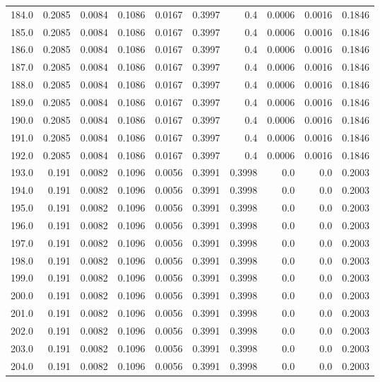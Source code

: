 \begin{longtable}{lrrrrrrrrr}
184.0 & 0.2085 & 0.0084 & 0.1086 & 0.0167 & 0.3997 & 0.4 & 0.0006 & 0.0016 & 0.1846 \\
185.0 & 0.2085 & 0.0084 & 0.1086 & 0.0167 & 0.3997 & 0.4 & 0.0006 & 0.0016 & 0.1846 \\
186.0 & 0.2085 & 0.0084 & 0.1086 & 0.0167 & 0.3997 & 0.4 & 0.0006 & 0.0016 & 0.1846 \\
187.0 & 0.2085 & 0.0084 & 0.1086 & 0.0167 & 0.3997 & 0.4 & 0.0006 & 0.0016 & 0.1846 \\
188.0 & 0.2085 & 0.0084 & 0.1086 & 0.0167 & 0.3997 & 0.4 & 0.0006 & 0.0016 & 0.1846 \\
189.0 & 0.2085 & 0.0084 & 0.1086 & 0.0167 & 0.3997 & 0.4 & 0.0006 & 0.0016 & 0.1846 \\
190.0 & 0.2085 & 0.0084 & 0.1086 & 0.0167 & 0.3997 & 0.4 & 0.0006 & 0.0016 & 0.1846 \\
191.0 & 0.2085 & 0.0084 & 0.1086 & 0.0167 & 0.3997 & 0.4 & 0.0006 & 0.0016 & 0.1846 \\
192.0 & 0.2085 & 0.0084 & 0.1086 & 0.0167 & 0.3997 & 0.4 & 0.0006 & 0.0016 & 0.1846 \\
193.0 & 0.191 & 0.0082 & 0.1096 & 0.0056 & 0.3991 & 0.3998 & 0.0 & 0.0 & 0.2003 \\
194.0 & 0.191 & 0.0082 & 0.1096 & 0.0056 & 0.3991 & 0.3998 & 0.0 & 0.0 & 0.2003 \\
195.0 & 0.191 & 0.0082 & 0.1096 & 0.0056 & 0.3991 & 0.3998 & 0.0 & 0.0 & 0.2003 \\
196.0 & 0.191 & 0.0082 & 0.1096 & 0.0056 & 0.3991 & 0.3998 & 0.0 & 0.0 & 0.2003 \\
197.0 & 0.191 & 0.0082 & 0.1096 & 0.0056 & 0.3991 & 0.3998 & 0.0 & 0.0 & 0.2003 \\
198.0 & 0.191 & 0.0082 & 0.1096 & 0.0056 & 0.3991 & 0.3998 & 0.0 & 0.0 & 0.2003 \\
199.0 & 0.191 & 0.0082 & 0.1096 & 0.0056 & 0.3991 & 0.3998 & 0.0 & 0.0 & 0.2003 \\
200.0 & 0.191 & 0.0082 & 0.1096 & 0.0056 & 0.3991 & 0.3998 & 0.0 & 0.0 & 0.2003 \\
201.0 & 0.191 & 0.0082 & 0.1096 & 0.0056 & 0.3991 & 0.3998 & 0.0 & 0.0 & 0.2003 \\
202.0 & 0.191 & 0.0082 & 0.1096 & 0.0056 & 0.3991 & 0.3998 & 0.0 & 0.0 & 0.2003 \\
203.0 & 0.191 & 0.0082 & 0.1096 & 0.0056 & 0.3991 & 0.3998 & 0.0 & 0.0 & 0.2003 \\
204.0 & 0.191 & 0.0082 & 0.1096 & 0.0056 & 0.3991 & 0.3998 & 0.0 & 0.0 & 0.2003 \\

\end{longtable}
